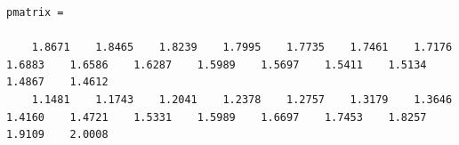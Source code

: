 \documentclass[12pt]{article}
\begin{document}
\begin{tiny}
\begin{verbatim}
pmatrix =

    1.8671    1.8465    1.8239    1.7995    1.7735    1.7461    1.7176    1.6883    1.6586    1.6287    1.5989    1.5697    1.5411    1.5134    1.4867    1.4612
    1.1481    1.1743    1.2041    1.2378    1.2757    1.3179    1.3646    1.4160    1.4721    1.5331    1.5989    1.6697    1.7453    1.8257    1.9109    2.0008

\end{verbatim}
\end{tiny}
\end{document}
